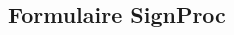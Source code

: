 \documentclass[12pt,a4paper,landscape]{article}
\begin{document}
\begin{multicols*}{2}

    \section*{Formulaire SignProc}
    
    
    
    
    
\end{multicols*}

\begin{multicols*}{2}
    
    \columnbreak
    
\end{multicols*}

\end{document}
